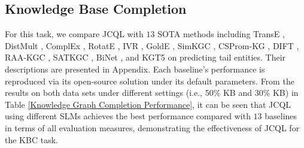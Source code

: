 \documentclass[11pt]{article}
\begin{document}



\subsection{Knowledge Base Completion} \label{4.2}
For this task, we compare JCQL with $13$ SOTA methods including TransE \cite{bordes2013}, DistMult \cite{yang2015}, ComplEx \cite{trouillon2016complex}, RotatE \cite{sun2018rotate}, IVR \cite{xiao2024knowledge}, GoldE \cite{GoldE}, SimKGC \cite{wang-etal-2022-simkgc}, CSProm-KG \cite{chen-etal-2023-dipping}, DIFT \cite{liu2024finetuninggenerativelargelanguage}, RAA-KGC \cite{raa-kgc}, SATKGC \cite{satkgc}, BiNet \cite{lihui2022binet}, and KGT5 \cite{saxena2022kgt5} on predicting tail entities. Their descriptions are presented in Appendix. Each baseline's performance is reproduced via its open-source solution under its default parameters. 
From the results on both data sets under different settings (i.e., 50\% KB and 30\% KB) in Table \ref{Knowledge Graph Completion Performance}, it can be seen that JCQL using different SLMs achieves the best performance compared with $13$ baselines in terms of all evaluation measures, demonstrating the effectiveness of JCQL for the KBC task. 
\end{document}
